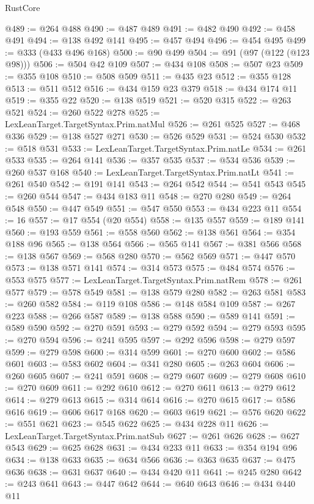 \begin{lexlean}{RustCore}
\begin{coremodule}
@489 := @264 @488
@490 := @487 @489
@491 := @482 @490
@492 := @458 @491
@494 := @138 @492 @141
@495 := @457 @494
@496 := @454 @495
@499 := @333 (@433 @496 @168)
@500 := @90 @499
@504 := @91 (@97 (@122 (@123 @98)))
@506 := @504 @42 @109
@507 := @434 @108
@508 := @507 @23
@509 := @355 @108
@510 := @508 @509
@511 := @435 @23
@512 := @355 @128
@513 := @511 @512
@516 := @434 @159 @23 @379
@518 := @434 @174 @11
@519 := @355 @22
@520 := @138 @519
@521 := @520 @315
@522 := @263 @521
@524 := @260 @522 @278
@525 := LexLeanTarget.TargetSyntax.Prim.natMul
@526 := @261 @525
@527 := @468 @336
@529 := @138 @527 @271
@530 := @526 @529
@531 := @524 @530
@532 := @518 @531
@533 := LexLeanTarget.TargetSyntax.Prim.natLe
@534 := @261 @533
@535 := @264 @141
@536 := @357 @535
@537 := @534 @536
@539 := @260 @537 @168
@540 := LexLeanTarget.TargetSyntax.Prim.natLt
@541 := @261 @540
@542 := @191 @141
@543 := @264 @542
@544 := @541 @543
@545 := @260 @544
@547 := @434 @183 @11
@548 := @270 @280
@549 := @264 @548
@550 := @447 @549
@551 := @547 @550
@553 := @434 @223 @11
@554 := 16
@557 := @17 @554 (@20 @554)
@558 := @135 @557
@559 := @189 @141
@560 := @193 @559
@561 := @558 @560
@562 := @138 @561
@564 := @354 @188 @96
@565 := @138 @564
@566 := @565 @141
@567 := @381 @566
@568 := @138 @567
@569 := @568 @280
@570 := @562 @569
@571 := @447 @570
@573 := @138 @571 @141
@574 := @314 @573
@575 := @484 @574
@576 := @553 @575
@577 := LexLeanTarget.TargetSyntax.Prim.natRem
@578 := @261 @577
@579 := @578 @549
@581 := @138 @579 @280
@582 := @263 @581
@583 := @260 @582
@584 := @119 @108
@586 := @148 @584 @109
@587 := @267 @223
@588 := @266 @587
@589 := @138 @588
@590 := @589 @141
@591 := @589 @590
@592 := @270 @591
@593 := @279 @592
@594 := @279 @593
@595 := @270 @594
@596 := @241 @595
@597 := @292 @596
@598 := @279 @597
@599 := @279 @598
@600 := @314 @599
@601 := @270 @600
@602 := @586 @601
@603 := @583 @602
@604 := @341 @280
@605 := @263 @604
@606 := @260 @605
@607 := @241 @591
@608 := @279 @607
@609 := @279 @608
@610 := @270 @609
@611 := @292 @610
@612 := @270 @611
@613 := @279 @612
@614 := @279 @613
@615 := @314 @614
@616 := @270 @615
@617 := @586 @616
@619 := @606 @617 @168
@620 := @603 @619
@621 := @576 @620
@622 := @551 @621
@623 := @545 @622
@625 := @434 @228 @11
@626 := LexLeanTarget.TargetSyntax.Prim.natSub
@627 := @261 @626
@628 := @627 @543
@629 := @625 @628
@631 := @434 @233 @11
@633 := @354 @194 @96
@634 := @138 @633
@635 := @634 @566
@636 := @363 @635
@637 := @475 @636
@638 := @631 @637
@640 := @434 @420 @11
@641 := @245 @280
@642 := @243 @641
@643 := @447 @642
@644 := @640 @643
@646 := @434 @440 @11

\end{coremodule}
\end{lexlean}
